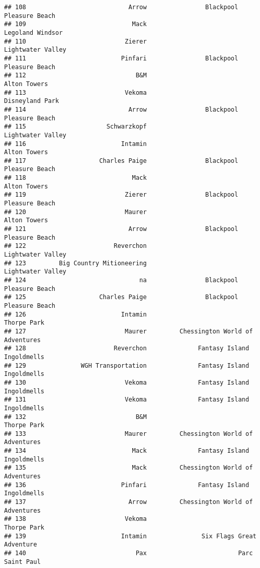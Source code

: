 \documentclass[
]{article}
\begin{document}
\begin{verbatim}
## 108                            Arrow                Blackpool Pleasure Beach
## 109                             Mack                        Legoland Windsor
## 110                           Zierer                       Lightwater Valley
## 111                          Pinfari                Blackpool Pleasure Beach
## 112                              B&M                            Alton Towers
## 113                           Vekoma                         Disneyland Park
## 114                            Arrow                Blackpool Pleasure Beach
## 115                      Schwarzkopf                       Lightwater Valley
## 116                          Intamin                            Alton Towers
## 117                    Charles Paige                Blackpool Pleasure Beach
## 118                             Mack                            Alton Towers
## 119                           Zierer                Blackpool Pleasure Beach
## 120                           Maurer                            Alton Towers
## 121                            Arrow                Blackpool Pleasure Beach
## 122                        Reverchon                       Lightwater Valley
## 123         Big Country Mitioneering                       Lightwater Valley
## 124                               na                Blackpool Pleasure Beach
## 125                    Charles Paige                Blackpool Pleasure Beach
## 126                          Intamin                             Thorpe Park
## 127                           Maurer         Chessington World of Adventures
## 128                        Reverchon              Fantasy Island Ingoldmells
## 129               WGH Transportation              Fantasy Island Ingoldmells
## 130                           Vekoma              Fantasy Island Ingoldmells
## 131                           Vekoma              Fantasy Island Ingoldmells
## 132                              B&M                             Thorpe Park
## 133                           Maurer         Chessington World of Adventures
## 134                             Mack              Fantasy Island Ingoldmells
## 135                             Mack         Chessington World of Adventures
## 136                          Pinfari              Fantasy Island Ingoldmells
## 137                            Arrow         Chessington World of Adventures
## 138                           Vekoma                             Thorpe Park
## 139                          Intamin               Six Flags Great Adventure
## 140                              Pax                         Parc Saint Paul

\end{verbatim}
\end{document}
